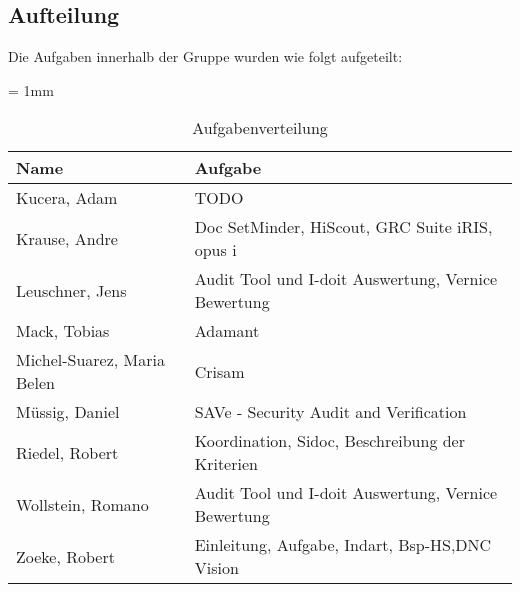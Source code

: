 \subsection{Aufteilung}
Die Aufgaben innerhalb der Gruppe wurden wie folgt aufgeteilt:

\begin{table}[H]
	\sffamily
	\caption{Aufgabenverteilung}
	\tabulinesep = 1mm %
	\centering
		\begin{tabu} to 0.9\textwidth { X[1.7]  X[3] }
		\hline
		\textbf{Name} & \textbf{Aufgabe}\\
		\hline 
		Kucera, Adam & TODO\\

		Krause, Andre & Doc SetMinder, HiScout, GRC Suite iRIS, opus i\\

		Leuschner, Jens & Audit Tool und I-doit Auswertung, Vernice Bewertung \\

		Mack, Tobias & Adamant\\

		Michel-Suarez, Maria Belen & Crisam\\

		Müssig, Daniel & SAVe - Security Audit and Verification\\

		Riedel, Robert & Koordination, Sidoc, Beschreibung der Kriterien\\

		Wollstein, Romano & Audit Tool und I-doit Auswertung, Vernice Bewertung\\

		Zoeke, Robert & Einleitung, Aufgabe, Indart, Bsp-HS,DNC Vision\\

	\end{tabu}
\end{table}
